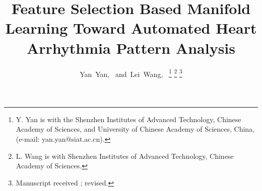 \documentclass[journal]{IEEEtran}
\begin{document}
%
\title{Feature Selection Based Manifold Learning Toward Automated Heart Arrhythmia Pattern Analysis}

%
%
%

\author{Yan~Yan,~
        and~Lei~Wang,~%
\thanks{Y. Yan is with the Shenzhen Institutes of Advanced Technology, Chinese Academy of Sciences, and University of Chinese Academy of Sciences, China, (e-mail: yan.yan@siat.ac.cn).}%
\thanks{L. Wang is with Shenzhen Institutes of Advanced Technology, Chinese Academy of Sciences.}%
\thanks{Manuscript received ; revised. }}

% 
%
\end{document}
